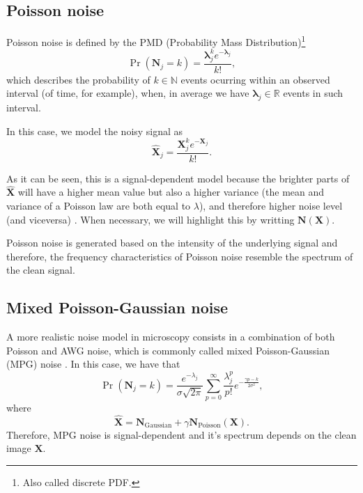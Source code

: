 \documentclass{article}
\begin{document}
\subsection{Poisson noise}
Poisson noise is defined by the PMD (Probability Mass
Distribution)\footnote{Also called discrete PDF.}
\begin{equation}
  \Pr({\mathbf N}_j{=}k) = \frac{\mathbf{\lambda}_j^ke^{-\mathbf{\lambda}_j}}{k!},
  \label{eq:PN}
\end{equation}
which describes the probability of $k\in\mathbb{N}$ events ocurring
within an observed interval (of time, for example), when, in average
we have ${\mathbf \lambda}_j\in\mathbb{R}$ events in such interval.

In this case, we model the noisy signal as
\begin{equation}
  \hat{{\mathbf X}}_j = \frac{{\mathbf X}_j^{k} e^{-{\mathbf X}_j}}{k!}.
\end{equation}

As it can be seen, this is a signal-dependent model because the
brighter parts of $\hat{\mathbf X}$ will have a higher mean value but
also a higher variance (the mean and variance of a Poisson law are
both equal to $\lambda$), and therefore higher noise level (and
viceversa) \cite{meiniel2018denoising}. When necessary, we will
highlight this by writting ${\mathbf N}({\mathbf X})$.

Poisson noise is generated based on the intensity of the underlying
signal and therefore, the frequency characteristics of Poisson noise
resemble the spectrum of the clean signal.

\subsection{Mixed Poisson-Gaussian noise}
A more realistic noise model in microscopy consists in a combination
of both Poisson and AWG noise, which is commonly called mixed
Poisson-Gaussian (MPG) noise \cite{meiniel2018denoising}. In this
case, we have that
\begin{equation}
  \Pr({\mathbf N}_j{=}k) = \frac{e^{-\lambda_j}}{\sigma\sqrt{2\pi}}\sum_{p=0}^{\infty}\frac{\lambda_j^p}{p!} e^{-\frac{\gamma p - k}{2\sigma^2}},
  \label{eq:PN}
\end{equation}
where
\begin{equation}
  \hat{\mathbf X} = {\mathbf N}_{\mathrm{Gaussian}} + \gamma{\mathbf N}_{\mathrm{Poisson}}({\mathbf X}).
  \label{eq:MPG_noise_model} 
\end{equation}
Therefore, MPG noise is signal-dependent and it's spectrum depends on the clean image $\mathbf{X}$.
\end{document}
